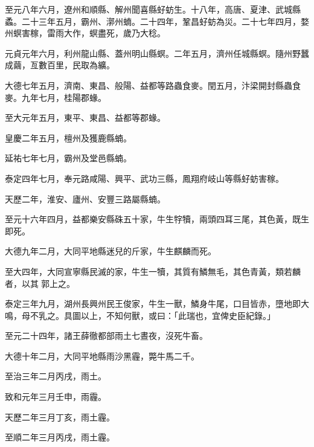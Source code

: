 \begin{pinyinscope}
 至元八年六月，遼州和順縣、解州聞喜縣虸蚄生。十八年，高唐、夏津、武城縣蟊。二十三年五月，霸州、漷州蝻。二十四年，鞏昌虸蚄為災。二十七年四月，婺州螟害稼，雷雨大作，螟盡死，歲乃大稔。



 元貞元年六月，利州龍山縣、蓋州明山縣螟。二年五月，濟州任城縣螟。隨州野蠶成繭，亙數百里，民取為纊。



 大德七年五月，濟南、東昌、般陽、益都等路蟲食麥。閏五月，汴梁開封縣蟲食麥。九年七月，桂陽郡蝝。



 至大元年五月，東平、東昌、益都等郡蝝。



 皇慶二年五月，檀州及獲鹿縣蝻。



 延祐七年七月，霸州及堂邑縣蝻。



 泰定四年七月，奉元路咸陽、興平、武功三縣，鳳翔府岐山等縣虸蚄害稼。



 天歷二年，淮安、廬州、安豐三路屬縣蝻。



 至元十六年四月，益都樂安縣硃五十家，牛生牸犢，兩頭四耳三尾，其色黃，既生即死。



 大德九年二月，大同平地縣迷兒的斤家，牛生麒麟而死。



 至大四年，大同宣寧縣民滅的家，牛生一犢，其質有鱗無毛，其色青黃，類若麟者，以其郭上之。



 泰定三年九月，湖州長興州民王俊家，牛生一獸，鱗身牛尾，口目皆赤，墮地即大鳴，母不乳之。具圖以上，不知何獸，或曰：「此瑞也，宜俾史臣紀錄。」



 至元二十四年，諸王薛徹都部雨土七晝夜，沒死牛畜。



 大德十年二月，大同平地縣雨沙黑霾，斃牛馬二千。



 至治三年二月丙戌，雨土。



 致和元年三月壬申，雨霾。



 天歷二年三月丁亥，雨土霾。



 至順二年三月丙戌，雨土霾。




\end{pinyinscope}
